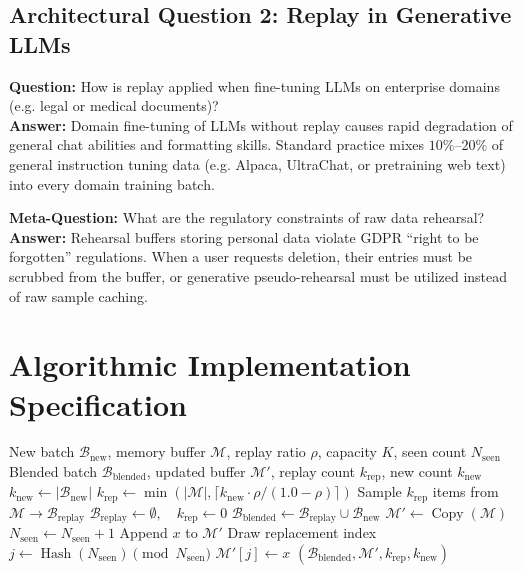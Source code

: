 \documentclass[11pt,a4paper]{article}
\theoremstyle{definition}
\begin{document}
\subsection{Architectural Question 2: Replay in Generative LLMs}
\textbf{Question:} How is replay applied when fine-tuning LLMs on enterprise domains (e.g. legal or medical documents)?\\
\textbf{Answer:} Domain fine-tuning of LLMs without replay causes rapid degradation of general chat abilities and formatting skills. Standard practice mixes $10\%\text{--}20\%$ of general instruction tuning data (e.g. Alpaca, UltraChat, or pretraining web text) into every domain training batch.

\textbf{Meta-Question:} What are the regulatory constraints of raw data rehearsal?\\
\textbf{Answer:} Rehearsal buffers storing personal data violate GDPR ``right to be forgotten'' regulations. When a user requests deletion, their entries must be scrubbed from the buffer, or generative pseudo-rehearsal must be utilized instead of raw sample caching.

\section{Algorithmic Implementation Specification}

\begin{algorithm}[H]
\caption{Replay Buffer Reservoir Update and Batch Blending}
\begin{algorithmic}[1]
\Require New batch $\mathcal{B}_{\text{new}}$, memory buffer $\mathcal{M}$, replay ratio $\rho$, capacity $K$, seen count $N_{\text{seen}}$
\Ensure Blended batch $\mathcal{B}_{\text{blended}}$, updated buffer $\mathcal{M}'$, replay count $k_{\text{rep}}$, new count $k_{\text{new}}$
\State $k_{\text{new}} \gets |\mathcal{B}_{\text{new}}|$
    \State $k_{\text{rep}} \gets \min(|\mathcal{M}|, \lceil k_{\text{new}} \cdot \rho / (1.0 - \rho) \rceil)$
    \State Sample $k_{\text{rep}}$ items from $\mathcal{M} \to \mathcal{B}_{\text{replay}}$
\Else
    \State $\mathcal{B}_{\text{replay}} \gets \emptyset, \quad k_{\text{rep}} \gets 0$
\EndIf
\State $\mathcal{B}_{\text{blended}} \gets \mathcal{B}_{\text{replay}} \cup \mathcal{B}_{\text{new}}$
\State $\mathcal{M}' \gets \operatorname{Copy}(\mathcal{M})$
    \State $N_{\text{seen}} \gets N_{\text{seen}} + 1$
        \State Append $x$ to $\mathcal{M}'$
    \Else
        \State Draw replacement index $j \gets \operatorname{Hash}(N_{\text{seen}}) \pmod{N_{\text{seen}}}$
            \State $\mathcal{M}'[j] \gets x$
        \EndIf
    \EndIf
\EndFor
\State \Return $(\mathcal{B}_{\text{blended}}, \mathcal{M}', k_{\text{rep}}, k_{\text{new}})$
\end{algorithmic}
\end{algorithm}
\end{document}

